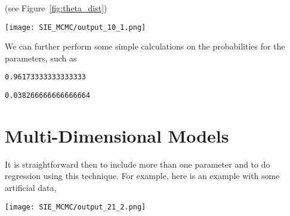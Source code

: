 (see Figure~\ref{fig:theta_dist})
\begin{figure*}
\centering
\texttt{[image: SIE\_MCMC/output\_10\_1.png]}
\caption{Distribution of $\theta$, and the 95\% credible interval.}
\label{fig:theta_dist}
\end{figure*}

We can further perform some simple calculations on the probabilities for the parameters, such as

\begin{Shaded}
\begin{Highlighting}[]
\NormalTok{)}
\end{Highlighting}
\end{Shaded}

\begin{verbatim}
0.96173333333333333
\end{verbatim}

\begin{Shaded}
\begin{Highlighting}[]
\NormalTok{)}
\end{Highlighting}
\end{Shaded}

\begin{verbatim}
0.038266666666666664
\end{verbatim}


\section{Multi-Dimensional Models}

It is straightforward then to include more than one parameter and to do regression using this technique.  For example, here is an example with some artificial data,


\begin{Shaded}
\begin{Highlighting}[]
 
     

                \NormalTok{,}\NormalTok{),}
                \NormalTok{,}\NormalTok{),}
                \NormalTok{)}
\end{Highlighting}
\end{Shaded}
\begin{marginfigure}
\centering
\texttt{[image: SIE\_MCMC/output\_21\_2.png]}
\caption{Chains for parameters $a$, $b$, and the noise $\sigma$.}
\end{marginfigure}
\begin{Shaded}
\begin{Highlighting}[]
\NormalTok{)}
\end{Highlighting}
\end{Shaded}


